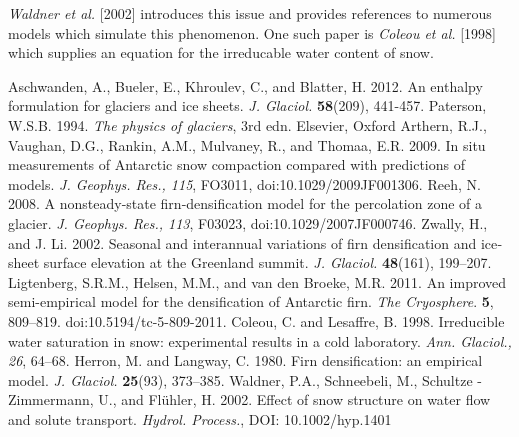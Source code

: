 \documentclass{article}%
\begin{document}
\emph{Waldner et al.} [2002] introduces this issue and provides references to numerous models which simulate this phenomenon.  One such paper is \emph{Coleou et al.} [1998] which supplies an equation for the irreducable water content of snow. 
\newpage
\begin{thebibliography}{1}

  Aschwanden, A., Bueler, E., Khroulev, C., and Blatter, H. 2012. An enthalpy formulation for glaciers and ice sheets. \textit{J. Glaciol.} \textbf{58}(209), 441-457.
  Paterson, W.S.B. 1994. \textit{The physics of glaciers}, 3rd edn. Elsevier, Oxford
  Arthern, R.J., Vaughan, D.G., Rankin, A.M., Mulvaney, R., and Thomaa, E.R. 2009. In situ measurements of Antarctic snow compaction compared with predictions of models. \textit{J. Geophys. Res., 115}, FO3011, doi:10.1029/2009JF001306.
  Reeh, N. 2008. A nonsteady\mbox{-}state firn\mbox{-}densification model for the percolation zone of a glacier. \textit{J. Geophys. Res., 113}, F03023, doi:10.1029/2007JF000746.
  Zwally, H., and J. Li. 2002. Seasonal and interannual variations of firn densification and ice\mbox{‐}sheet surface elevation at the Greenland summit. \textit{J. Glaciol.} \textbf{48}(161), 199–207.
  Ligtenberg, S.R.M., Helsen, M.M., and van den Broeke, M.R. 2011. An improved semi\mbox{-}empirical model for the densification of Antarctic firn. \textit{The Cryosphere}. \textbf{5}, 809–819. doi:10.5194/tc-5-809-2011.
  \bibitem{}Coleou, C. and Lesaffre, B. 1998. Irreducible water saturation in snow: experimental results in a cold laboratory. \textit{Ann. Glaciol., 26}, 64–68.
  Herron, M. and Langway, C. 1980. Firn densification: an empirical model. \textit{J. Glaciol.} \textbf{25}(93), 373–385.
  Waldner, P.A., Schneebeli, M., Schultze \mbox{-} Zimmermann, U., and Fl\"{u}hler, H. 2002. Effect of snow structure on water flow and solute transport. \textit{Hydrol. Process.}, DOI: 10.1002/hyp.1401

\end{thebibliography}
\end{document}
